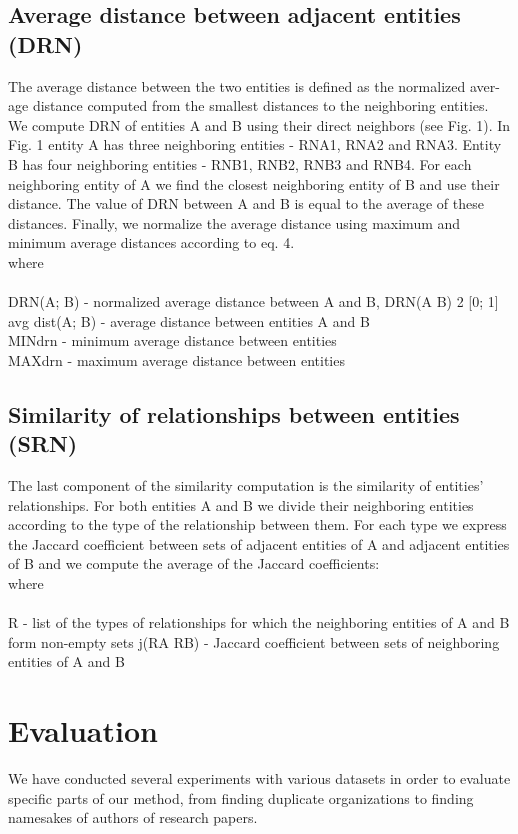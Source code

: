 \documentclass{llncs}
\begin{document}
\subsection {Average distance between adjacent entities (DRN)}
The average distance between the two entities is defined as the normalized aver-
age distance computed from the smallest distances to the neighboring entities.
We compute DRN of entities A and B using their direct neighbors (see Fig. 1).
In Fig. 1 entity A has three neighboring entities - RNA1, RNA2 and RNA3.
Entity B has four neighboring entities - RNB1, RNB2, RNB3 and RNB4. For
each neighboring entity of A we find the closest neighboring entity of B and use
their distance. The value of DRN between A and B is equal to the average of
these distances. Finally, we normalize the average distance using maximum and
minimum average distances according to eq. 4.\\
where\\
\vspace{2mm} \\
DRN(A; B) - normalized average distance between A and B, DRN(A B) 2 [0; 1]\\
avg dist(A; B) - average distance between entities A and B\\
MINdrn - minimum average distance between entities\\
MAXdrn - maximum average distance between entities\\

\subsection{Similarity of relationships between entities (SRN)}
The last component of the similarity computation is the similarity of entities'
relationships. For both entities A and B we divide their neighboring entities
according to the type of the relationship between them. For each type we express
the Jaccard coefficient between sets of adjacent entities of A and adjacent entities
of B and we compute the average of the Jaccard coefficients:\\
where\\
\vspace{2mm} \\
R - list of the types of relationships for which the neighboring entities of A and
B form non-empty sets
j(RA RB) - Jaccard coefficient between sets of neighboring entities of A and B
\section{Evaluation}
We have conducted several experiments with various datasets in order to evaluate
specific parts of our method, from finding duplicate organizations to finding
namesakes of authors of research papers.
\end{document}
